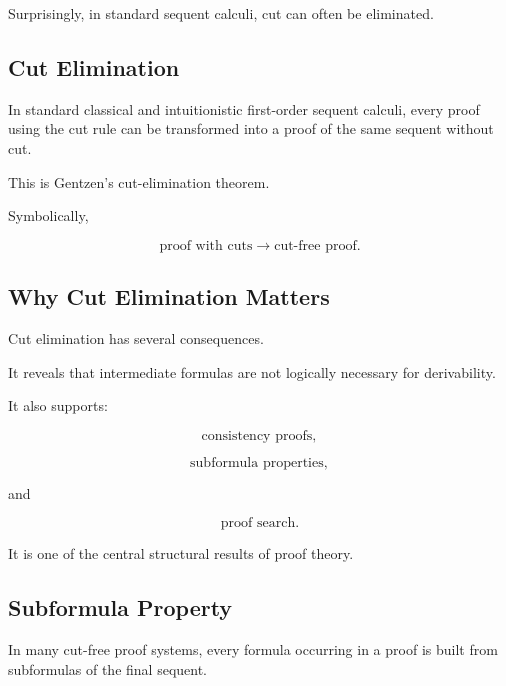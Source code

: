 Surprisingly, in standard sequent calculi, cut can often be eliminated.

\subsection{Cut Elimination}
\label{subsec:cut-elimination}

\begin{theorem}
In standard classical and intuitionistic first-order sequent calculi, every
proof using the cut rule can be transformed into a proof of the same sequent
without cut.
\end{theorem}

This is Gentzen's cut-elimination theorem.

Symbolically,

\[
\boxed{
\text{proof with cuts}
\longrightarrow
\text{cut-free proof}.
}
\]

\subsection{Why Cut Elimination Matters}
\label{subsec:why-cut-elimination-matters}

Cut elimination has several consequences.

It reveals that intermediate formulas are not logically necessary for
derivability.

It also supports:

\[
\boxed{
\text{consistency proofs},
}
\]

\[
\boxed{
\text{subformula properties},
}
\]

and

\[
\boxed{
\text{proof search}.
}
\]

It is one of the central structural results of proof theory.

\subsection{Subformula Property}
\label{subsec:subformula-property}

In many cut-free proof systems, every formula occurring in a proof is built
from subformulas of the final sequent.

